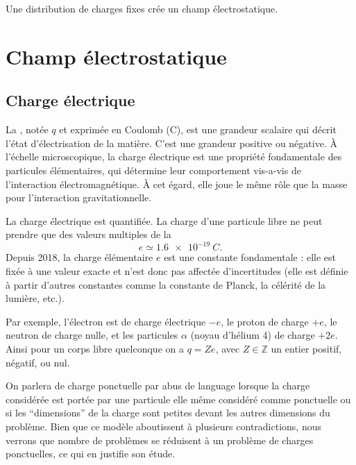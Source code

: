 \documentclass[12pt,fancy]{/Users/victor/Documents/COURS/2ACapECL/texmf/tex/latex/Preambles/cours}
\begin{document}
\maketitre{}





\begin{definition}
 Une distribution de charges fixes crée un champ électrostatique.
\end{definition}


\section{Champ électrostatique}

\subsection{Charge électrique}
La , notée $q$ et exprimée en Coulomb (C), est une grandeur scalaire qui décrit l'état d'électrisation de la matière. C’est une grandeur positive ou négative.
À l’échelle microscopique, la charge électrique est une propriété fondamentale des particules élémentaires, qui détermine leur comportement vis-a-vis de l'interaction électromagnétique.
À cet égard, elle joue le même rôle que la masse pour l'interaction gravitationnelle.

La charge électrique est quantifiée. La charge d’une particule libre ne peut prendre que des valeurs multiples de la 
\begin{equation*}
e\simeq\SI{1,6e-19}{C}.
\end{equation*}
Depuis 2018, la charge élémentaire $e$ est une constante fondamentale : elle est fixée à une valeur exacte et n’est donc pas affectée d’incertitudes (elle est définie à partir d’autres constantes comme la constante de Planck, la célérité de la lumière, etc.). 

Par exemple, l’électron est de charge électrique $-e$, le proton de charge $+e$, le neutron de charge nulle, et les particules $\alpha$ (noyau d’hélium 4) de charge $+2e$. Ainsi pour un corps libre quelconque on a $q=Ze$, avec $Z\in\mathbb{Z}$ un entier positif, négatif, ou nul.

On parlera de charge ponctuelle par abus de language lorsque la charge considérée est portée par une particule elle même considéré comme ponctuelle ou si les ``dimensions'' de la charge sont petites devant les autres dimensions du problème.  Bien que ce modèle aboutissent à plusieurs contradictions, nous verrons que nombre de problèmes se réduisent à un problème de charges ponctuelles, ce qui en justifie son étude.
\end{document}

